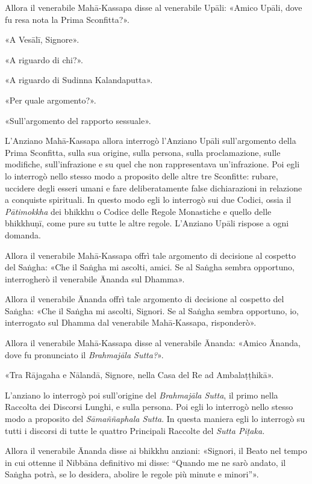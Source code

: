 Allora il venerabile Mahā-Kassapa disse al venerabile Upāli: «Amico
Upāli, dove fu resa nota la Prima Sconfitta?».


«A Vesālī, Signore».


«A riguardo di chi?».


«A riguardo di Sudinna Kalandaputta».


«Per quale argomento?».


«Sull’argomento del rapporto sessuale».


 L’Anziano Mahā-Kassapa allora interrogò l’Anziano
Upāli sull’argomento della Prima Sconfitta, sulla sua origine, sulla
persona, sulla proclamazione, sulle modifiche, sull’infrazione e su quel
che non rappresentava un’infrazione. Poi egli lo interrogò nello stesso
modo a proposito delle altre tre Sconfitte: rubare, uccidere degli
esseri umani e fare deliberatamente false dichiarazioni in relazione a
conquiste spirituali. In questo modo egli lo interrogò sui due Codici,
ossia il \emph{Pātimokkha} dei bhikkhu o Codice delle Regole Monastiche e
quello delle bhikkhuṇī, come pure su tutte le altre regole. L’Anziano
Upāli rispose a ogni domanda.


 Allora il venerabile Mahā-Kassapa offrì tale argomento di
decisione al cospetto del Saṅgha: «Che il Saṅgha mi ascolti, amici. Se
al Saṅgha sembra opportuno, interrogherò il venerabile Ānanda sul
Dhamma».


Allora il venerabile Ānanda offrì tale argomento di decisione al
cospetto del Saṅgha: «Che il Saṅgha mi ascolti, Signori. Se al Saṅgha
sembra opportuno, io, interrogato sul Dhamma dal venerabile
Mahā-Kassapa, risponderò».


Allora il venerabile Mahā-Kassapa disse al venerabile Ānanda: «Amico
Ānanda, dove fu pronunciato il \emph{Brahmajāla Sutta?}».


«Tra Rājagaha e Nālandā, Signore, nella Casa del Re ad Ambalaṭṭhikā».


 L’anziano lo interrogò poi sull’origine del
\emph{Brahmajāla Sutta}, il primo nella Raccolta dei Discorsi Lunghi, e sulla
persona. Poi egli lo interrogò nello stesso modo a proposito del
\emph{Sāmaññaphala Sutta}. In questa maniera egli lo interrogò su tutti i
discorsi di tutte le quattro Principali Raccolte del \emph{Sutta Piṭaka.}


 Allora il venerabile Ānanda disse ai bhikkhu anziani:
«Signori, il Beato nel tempo in cui ottenne il Nibbāna definitivo mi
disse: “Quando me ne sarò andato, il Saṅgha potrà, se lo desidera,
abolire le regole più minute e minori”».


